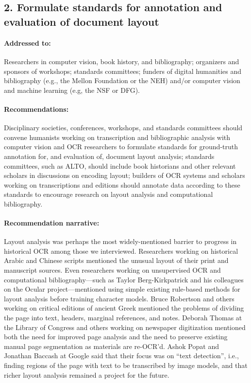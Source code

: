 \documentclass[twoside,11pt]{report}
\begin{document}
\subsection{2. Formulate standards for annotation and evaluation of document layout}
\label{sec:rec-layout}

\paragraph{Addressed to:} Researchers in computer vision, book history, and bibliography; organizers and sponsors of workshops; standards committees; funders of digital humanities and bibliography (e.g., the Mellon Foundation or the NEH) and/or computer vision and machine learning (e.g, the NSF or DFG).

\paragraph{Recommendations:} Disciplinary societies, conferences, workshops, and standards committees should convene humanists working on transcription and bibliographic analysis with computer vision and OCR researchers to formulate standards for ground-truth annotation for, and evaluation of, document layout analysis; standards committees, such as ALTO, should include book historians and other relevant scholars in discussions on encoding layout; builders of OCR systems and scholars working on transcriptions and editions should annotate data according to these standards to encourage research on layout analysis and computational bibliography.

\paragraph{Recommendation narrative:}

Layout analysis was perhaps the most widely-mentioned barrier to progress in historical OCR among those we interviewed. Researchers working on historical Arabic and Chinese scripts mentioned the unusual layout of their print and manuscript sources. Even researchers working on unsupervised OCR and computational bibliography---such as Taylor Berg-Kirkpatrick and his colleagues on the Ocular project---mentioned using simple existing rule-based methods for layout analysis before training character models. Bruce Robertson and others working on critical editions of ancient Greek mentioned the problems of dividing the page into text, headers, marginal references, and notes. Deborah Thomas at the Library of Congress and others working on newspaper digitization mentioned both the need for improved page analysis and the need to preserve existing manual page segmentation as materials are re-OCR'd. Ashok Popat and Jonathan Baccash at Google said that their focus was on ``text detection'', i.e., finding regions of the page with text to be transcribed by image models, and that richer layout analysis remained a project for the future.
\end{document}
